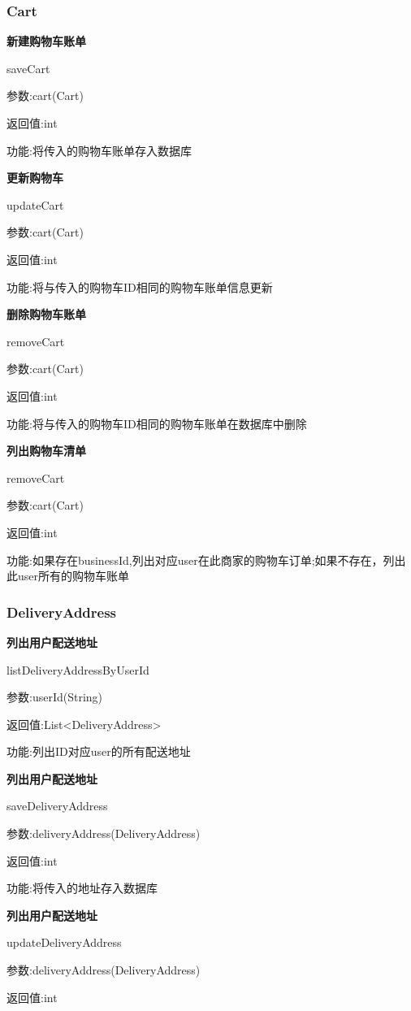 \subsubsection{Cart}
\textbf{新建购物车账单}

saveCart

参数:cart(Cart)

返回值:int

功能:将传入的购物车账单存入数据库

\textbf{更新购物车}

updateCart

参数:cart(Cart)

返回值:int

功能:将与传入的购物车ID相同的购物车账单信息更新

\textbf{删除购物车账单}

removeCart

参数:cart(Cart)

返回值:int

功能:将与传入的购物车ID相同的购物车账单在数据库中删除

\textbf{列出购物车清单}

removeCart

参数:cart(Cart)

返回值:int

功能:如果存在businessId,列出对应user在此商家的购物车订单;如果不存在，列出此user所有的购物车账单

\subsubsection{DeliveryAddress}

\textbf{列出用户配送地址}

listDeliveryAddressByUserId

参数:userId(String)

返回值:List<DeliveryAddress>

功能:列出ID对应user的所有配送地址

\textbf{列出用户配送地址}

saveDeliveryAddress

参数:deliveryAddress(DeliveryAddress)

返回值:int

功能:将传入的地址存入数据库

\textbf{列出用户配送地址}

updateDeliveryAddress

参数:deliveryAddress(DeliveryAddress)

返回值:int

